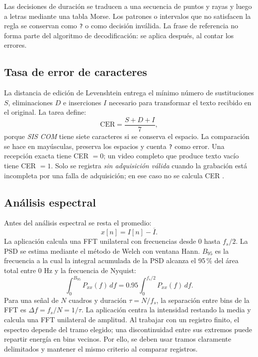 \documentclass[11pt,a4paper]{article}
\begin{document}
Las decisiones de duración se traducen a una secuencia de puntos y rayas y luego a letras mediante una tabla Morse. Los patrones o intervalos que no satisfacen la regla se conservan como \texttt{?} o como decisión inválida. La frase de referencia no forma parte del algoritmo de decodificación: se aplica después, al contar los errores.

\subsection{Tasa de error de caracteres}
La distancia de edición de Levenshtein entrega el mínimo número de sustituciones \(S\), eliminaciones \(D\) e inserciones \(I\) necesario para transformar el texto recibido en el original. La tarea define:
\begin{equation}
\mathrm{CER}=\frac{S+D+I}{7},
\label{eq:cer}
\end{equation}
porque \textit{SIS COM} tiene siete caracteres si se conserva el espacio. La comparación se hace en mayúsculas, preserva los espacios y cuenta \texttt{?} como error. Una recepción exacta tiene CER \(=0\); un video completo que produce texto vacío tiene CER \(=1\). Solo se registra \textit{sin adquisición válida} cuando la grabación está incompleta por una falla de adquisición; en ese caso no se calcula CER \cite{Pauta,CER}.

\subsection{Análisis espectral}
Antes del análisis espectral se resta el promedio:
\begin{equation}
x[n]=I[n]-\overline{I}.
\end{equation}
La aplicación calcula una FFT unilateral con frecuencias desde 0 hasta \(f_s/2\). La PSD se estima mediante el método de Welch con ventana Hann. \(B_{95}\) es la frecuencia a la cual la integral acumulada de la PSD alcanza el 95\,\% del área total entre 0 Hz y la frecuencia de Nyquist:
\begin{equation}
\int_{0}^{B_{95}} P_{xx}(f)\,df
=
0.95\int_{0}^{f_s/2}P_{xx}(f)\,df.
\label{eq:b95}
\end{equation}
Para una señal de \(N\) cuadros y duración \(\tau=N/f_s\), la separación entre bins de la FFT es \(\Delta f=f_s/N=1/\tau\). La aplicación centra la intensidad restando la media y calcula una FFT unilateral de amplitud. Al trabajar con un registro finito, el espectro depende del tramo elegido; una discontinuidad entre sus extremos puede repartir energía en bins vecinos. Por ello, se deben usar tramos claramente delimitados y mantener el mismo criterio al comparar registros.
\end{document}

